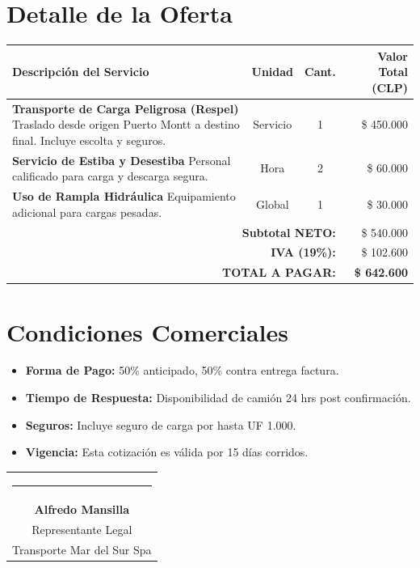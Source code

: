 \documentclass[11pt, a4paper]{article}
\begin{document}
\section*{\color{hazard}\faFileInvoiceDollar \hspace{0.2cm} Detalle de la Oferta}
\renewcommand{\arraystretch}{1.5}
\begin{tabularx}{\textwidth}{|X|c|c|r|}
    \hline
    \rowcolor{dark} \textbf{\color{white}Descripción del Servicio} & \textbf{\color{white}Unidad} & \textbf{\color{white}Cant.} & \textbf{\color{white}Valor Total (CLP)} \\ \hline
    \rowcolor{light} \textbf{Transporte de Carga Peligrosa (Respel)} \newline Traslado desde origen Puerto Montt a destino final. Incluye escolta y seguros. & Servicio & 1 & \$ 450.000 \\ \hline
    \textbf{Servicio de Estiba y Desestiba} \newline Personal calificado para carga y descarga segura. & Hora & 2 & \$ 60.000 \\ \hline
    \rowcolor{light} \textbf{Uso de Rampla Hidráulica} \newline Equipamiento adicional para cargas pesadas. & Global & 1 & \$ 30.000 \\ \hline
    \multicolumn{3}{|r|}{\textbf{Subtotal NETO:}} & \$ 540.000 \\ \hline
    \multicolumn{3}{|r|}{\textbf{IVA (19\%):}} & \$ 102.600 \\ \hline
    \multicolumn{3}{|r|}{\textbf{\large TOTAL A PAGAR:}} & \textbf{\large \$ 642.600} \\ \hline
\end{tabularx}

\vspace{1cm}

\section*{\color{hazard}\faHandshake \hspace{0.2cm} Condiciones Comerciales}
\begin{itemize}
    \item \textbf{Forma de Pago:} 50\% anticipado, 50\% contra entrega factura.
    \item \textbf{Tiempo de Respuesta:} Disponibilidad de camión 24 hrs post confirmación.
    \item \textbf{Seguros:} Incluye seguro de carga por hasta UF 1.000.
    \item \textbf{Vigencia:} Esta cotización es válida por 15 días corridos.
\end{itemize}

\vspace{2cm}

\begin{center}
    \begin{tabular}{c}
        \rule{7cm}{0.4pt} \\
        \textbf{Alfredo Mansilla} \\
        Representante Legal \\
        Transporte Mar del Sur Spa
    \end{tabular}
\end{center}
\end{document}
